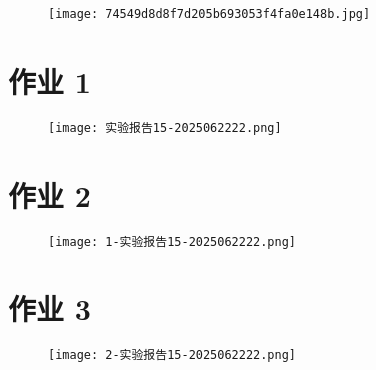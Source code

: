 \begin{figure}[H]
\centering
\texttt{[image: 74549d8d8f7d205b693053f4fa0e148b.jpg]}
\label{}
\end{figure}

\section{作业 1}

\begin{figure}[H]
\centering
\texttt{[image: 实验报告15-2025062222.png]}
\label{}
\end{figure}

\section{作业 2}

\begin{figure}[H]
\centering
\texttt{[image: 1-实验报告15-2025062222.png]}
\label{}
\end{figure}

\section{作业 3}

\begin{figure}[H]
\centering
\texttt{[image: 2-实验报告15-2025062222.png]}
\label{}
\end{figure}

